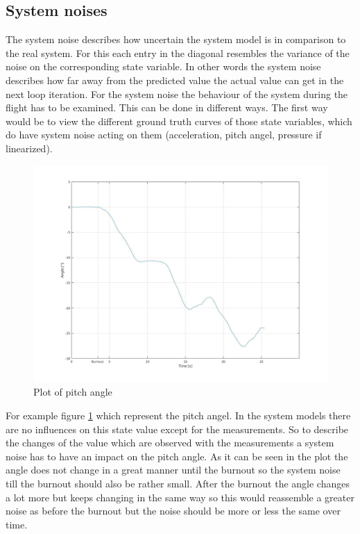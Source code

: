 \subsection{System noises}
The system noise describes how uncertain the system model is in comparison to the real system.
For this each entry in the diagonal resembles the variance of the noise on the corresponding state variable.
In other words the system noise describes how far away from the predicted value the actual value can get in the next loop iteration.
For the system noise the behaviour of the system during the flight has to be examined.
This can be done in different ways.
The first way would be to view the different ground truth curves of those state variables,
which do have system noise acting on them (acceleration, pitch angel, pressure if linearized).
\begin{figure}[h]
 \centering
 \includegraphics[width=.8\textwidth]{./Pictures/PitchAnglePlot.jpg}
 \caption{Plot of pitch angle}
 \label{fig:PitchAnglePlot}
\end{figure}
For example figure \ref{fig:PitchAnglePlot} which represent the pitch angel.
In the system models there are no influences on this state value except for the measurements.
So to describe the changes of the value which are observed with the measurements a system noise has to have an impact on the pitch angle.
As it can be seen in the plot the angle does not change in a great manner until the burnout so the system noise till the burnout should also be rather small.
After the burnout the angle changes a lot more but keeps changing in the same way so this would reassemble a greater noise as before the burnout 
but the noise should be more or less the same over time. \\

